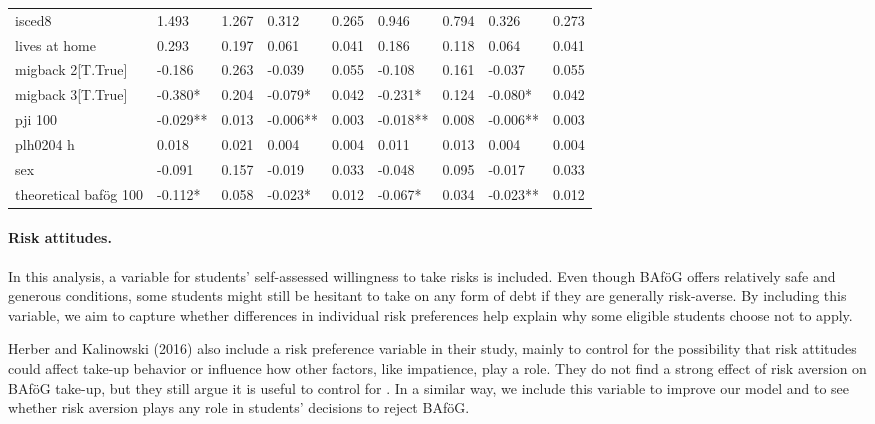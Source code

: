 \begin{table}
\begin{tabular}{lllllllll}
isced8                  & 1.493     & 1.267     & 0.312      & 0.265      & 0.946     & 0.794      & 0.326      & 0.273     \\
lives at home           & 0.293     & 0.197     & 0.061      & 0.041      & 0.186     & 0.118      & 0.064      & 0.041     \\
migback 2[T.True]       & -0.186    & 0.263     & -0.039     & 0.055      & -0.108    & 0.161      & -0.037     & 0.055     \\
migback 3[T.True]       & -0.380*   & 0.204     & -0.079*    & 0.042      & -0.231*   & 0.124      & -0.080*    & 0.042     \\
pji 100                 & -0.029**  & 0.013     & -0.006**   & 0.003      & -0.018**  & 0.008      & -0.006**   & 0.003     \\
plh0204 h               & 0.018     & 0.021     & 0.004      & 0.004      & 0.011     & 0.013      & 0.004      & 0.004     \\
sex                     & -0.091    & 0.157     & -0.019     & 0.033      & -0.048    & 0.095      & -0.017     & 0.033     \\
theoretical bafög 100   & -0.112*   & 0.058     & -0.023*    & 0.012      & -0.067*   & 0.034      & -0.023**   & 0.012     \\
\bottomrule
\end{tabular}
\end{table}


\paragraph{Risk attitudes.} In this analysis, a variable for students' self-assessed willingness to take risks is included. Even though BAföG offers relatively safe and generous conditions, some students might still be hesitant to take on any form of debt if they are generally risk-averse. By including this variable, we aim to capture whether differences in individual risk preferences help explain why some eligible students choose not to apply.

Herber and Kalinowski (2016) also include a risk preference variable in their study, mainly to control for the possibility that risk attitudes could affect take-up behavior or influence how other factors, like impatience, play a role. They do not find a strong effect of risk aversion on BAföG take-up, but they still argue it is useful to control for \citep{herber_non-take-up_2019}. In a similar way, we include this variable to improve our model and to see whether risk aversion plays any role in students’ decisions to reject BAföG.

